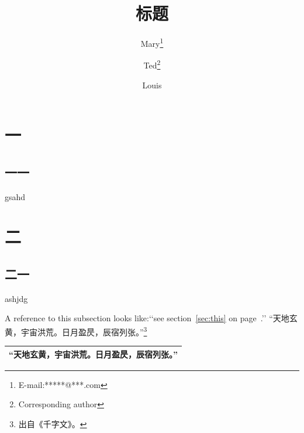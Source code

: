 \documentclass{book}
\title{标题}
\author{Mary\thanks{E-mail:*****@***.com}\and Ted\thanks{Corresponding author}\and Louis}
\begin{document}
 
	\maketitle	%
    \tableofcontents    %
    \mainmatter		%
    \chapter{一}        %
        \section{一一}
        gsahd
    \chapter*{二}
        \section{二一}
        ashjdg
        
        A reference to this subsection\label{sec:this} looks like:‘‘see section~\ref{sec:this} on page~\pageref{sec:this}.’’
        “天地玄黄，宇宙洪荒。日月盈昃，辰宿列张。”\footnote{出自《千字文》。}
        
        \begin{tabular}{l}
            \hline
        “天地玄黄，宇宙洪荒。日月盈昃，辰宿列张。”\footnotemark \\
            \hline
        \end{tabular}
        
\end{document}
